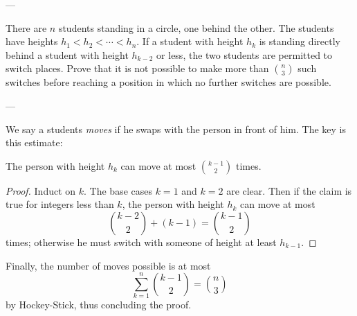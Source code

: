 
---

There are $n$ students standing in a circle, one behind the other. The students have heights $h_1<h_2<\cdots<h_n$. If a student with height $h_k$ is standing directly behind a student with height $h_{k-2}$ or less, the two students are permitted to switch places. Prove that it is not possible to make more than $\binom n3$ such switches before reaching a position in which no further switches are possible.

---

We say a students \emph{moves} if he swaps with the person in front of him. The key is this estimate:
\begin{iclaim*}
    The person with height $h_k$ can move at most $\binom{k-1}2$ times.
\end{iclaim*}
\begin{proof}
    Induct on $k$. The base cases $k=1$ and $k=2$ are clear. Then if the claim is true for integers less than $k$, the person with height $h_k$ can move at most \[\binom{k-2}2+(k-1)=\binom{k-1}2\]
    times; otherwise he must switch with someone of height at least $h_{k-1}$.
\end{proof}

Finally, the number of moves possible is at most \[\sum_{k=1}^n\binom{k-1}2=\binom n3\]
by Hockey-Stick, thus concluding the proof.

